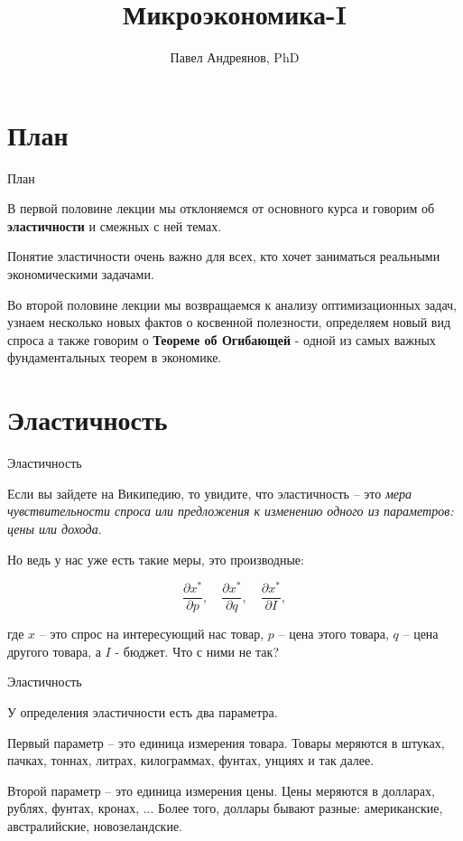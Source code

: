 \documentclass{beamer}
\title{
Микроэкономика-I
}
\author{
Павел Андреянов, PhD
}
\begin{document}
\maketitle

\section{План}

\begin{frame}{План}

В первой половине лекции мы отклоняемся от основного курса и говорим об  \textbf{эластичности} и смежных с ней темах. 

Понятие эластичности очень важно для всех, кто хочет заниматься реальными экономическими задачами.

Во второй половине лекции мы возвращаемся к анализу оптимизационных задач, узнаем несколько новых фактов о косвенной полезности, определяем новый вид спроса а также говорим о \textbf{Теореме об Огибающей} - одной из самых важных фундаментальных теорем в экономике.

\end{frame}


\section{Эластичность}

\begin{frame}{Эластичность}

Если вы зайдете на Википедию, то увидите, что эластичность – это \textit{мера чувствительности спроса или предложения к изменению одного из параметров: цены или дохода}. 

Но ведь у нас уже есть такие меры, это производные:

$$\frac{\partial x^{\ast}}{\partial p}, \quad \frac{\partial x^{\ast}}{\partial q}, \quad \frac{\partial x^{\ast}}{\partial I},$$

где $x$ – это спрос на интересующий нас товар, $p$ – цена этого товара, $q$ – цена другого товара, а $I$ - бюджет. Что с ними не так?

\end{frame}

\begin{frame}{Эластичность}

У определения эластичности есть два параметра. 

Первый параметр – это единица измерения товара. Товары меряются в штуках, пачках, тоннах, литрах, килограммах, фунтах, унциях и так далее. 

Второй параметр – это единица измерения цены. Цены меряются в долларах, рублях, фунтах, кронах, ... Более того, доллары бывают разные: американские, австралийские, новозеландские. 

\end{frame}
\end{document}
